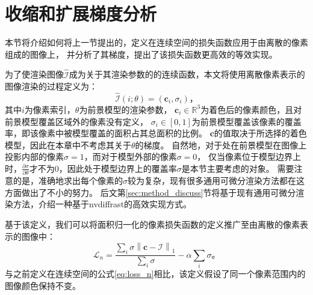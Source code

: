 \section{收缩和扩展梯度分析}

本节将介绍如何将上一节提出的，定义在连续空间的损失函数应用于由离散的像素组成的图像上，
并分析了其梯度，提出了该损失函数更高效的等效实现。

为了使渲染图像$\hat{\mathcal{I}}$成为关于其渲染参数的的连续函数，本文将使用离散像素表示的图像渲染的过程定义为：
\begin{equation}
\hat{\mathcal{I}}(i;\theta) = (\mathbf{c}_i, \sigma_i)
\text{，}
\label{eq:rendering}
\end{equation}
其中$i$为像素索引，$\theta$为前景模型的渲染参数，
$\mathbf{c}_i\in\mathbb{R}^3$为着色后的像素颜色，且对前景模型覆盖区域外的像素没有定义，
$\sigma_i\in[0,1]$为前景模型覆盖该像素的覆盖率，即该像素中被模型覆盖的面积占其总面积的比例。
$\mathbf{c}$的值取决于所选择的着色模型，因此在本章中不考虑其关于$\theta$的梯度。
自然地，对于处在前景模型在图像上投影内部的像素$\sigma=1$，而对于模型外部的像素$\sigma=0$，
仅当像素位于模型边界上时，$\frac{\partial\sigma}{\partial\theta}$才不为0，因此处于模型边界上的覆盖率$\sigma$是本节主要考虑的对象。
需要注意的是，准确地求出每个像素的$\sigma$较为复杂，现有很多通用可微分渲染方法都在这方面做出了不小的努力。
后文第\ref{sec:method_discuss}节将基于现有通用可微分渲染方法，介绍一种基于nvdiffrast的高效实现方式。

基于该定义，我们可以将面积归一化的像素损失函数的定义推广至由离散的像素表示的图像中：
\begin{equation}
\mathcal{L}_n = \frac{\sum_{i} \sigma \left\| \mathbf{c} - \mathcal{I} \right\|_1}
{\sum_{i} \sigma} - \alpha \sum_{i} \sigma
\text{。}
\label{eq:loss_n_pixel}
\end{equation}
与之前定义在连续空间的公式\ref{eq:loss_n}相比，该定义假设了同一个像素范围内的图像颜色保持不变。

